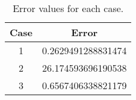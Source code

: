 \begin{table}[htbp]
	 \centering
	 \caption{Error values for each case.}
	 \begin{tabular}{cc}
		 \toprule
		 Case & Error \\ 
		 \midrule 
		 1 & 0.2629491288831474 \\ 
		 2 & 26.174593696190538 \\ 
		 3 & 0.6567406338821179 \\ 
		 \bottomrule 
	 \end{tabular} 
	 \label{tab:error} 
\end{table}